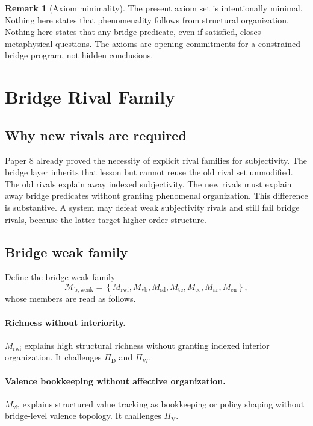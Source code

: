 \documentclass[11pt,a4paper]{article}
\theoremstyle{definition}
\newtheorem{remark}[theorem]{Remark}
\newcommand{\PiD}{\Pi_{\mathrm{D}}}
\newcommand{\PiV}{\Pi_{\mathrm{V}}}
\newcommand{\PiW}{\Pi_{\mathrm{W}}}
\newcommand{\BridgeWeakFam}{\mathcal{M}_{\mathrm{b,weak}}}
\begin{document}
\begin{remark}[Axiom minimality]
The present axiom set is intentionally minimal. Nothing here states that phenomenality follows from structural organization. Nothing here states that any bridge predicate, even if satisfied, closes metaphysical questions. The axioms are opening commitments for a constrained bridge program, not hidden conclusions.
\end{remark}

\section{Bridge Rival Family}
\subsection{Why new rivals are required}
Paper 8 already proved the necessity of explicit rival families for subjectivity. The bridge layer inherits that lesson but cannot reuse the old rival set unmodified. The old rivals explain away indexed subjectivity. The new rivals must explain away bridge predicates without granting phenomenal organization. This difference is substantive. A system may defeat weak subjectivity rivals and still fail bridge rivals, because the latter target higher-order structure.

\subsection{Bridge weak family}
Define the bridge weak family
\[
\BridgeWeakFam=
\left\{
M_{\mathrm{rwi}},
M_{\mathrm{vb}},
M_{\mathrm{sd}},
M_{\mathrm{tc}},
M_{\mathrm{ec}},
M_{\mathrm{ar}},
M_{\mathrm{en}}
\right\},
\]
whose members are read as follows.

\paragraph{Richness without interiority.}
$M_{\mathrm{rwi}}$ explains high structural richness without granting indexed interior organization. It challenges $\PiD$ and $\PiW$.

\paragraph{Valence bookkeeping without affective organization.}
$M_{\mathrm{vb}}$ explains structured value tracking as bookkeeping or policy shaping without bridge-level valence topology. It challenges $\PiV$.
\end{document}
